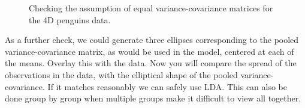 \documentclass[
  letterpaper,
]{book}
\begin{document}
\begin{figure}

\begin{minipage}[t]{0.50\linewidth}

{\centering 

}

\end{minipage}%

\caption{\label{fig-penguins-lda-ellipses}Checking the assumption of
equal variance-covariance matrices for the 4D penguins data.}

\end{figure}

As a further check, we could generate three ellipses corresponding to
the pooled variance-covariance matrix, as would be used in the model,
centered at each of the means. Overlay this with the data. Now you will
compare the spread of the observations in the data, with the elliptical
shape of the pooled variance-covariance. If it matches reasonably we can
safely use LDA. This can also be done group by group when multiple
groups make it difficult to view all together.
\end{document}
